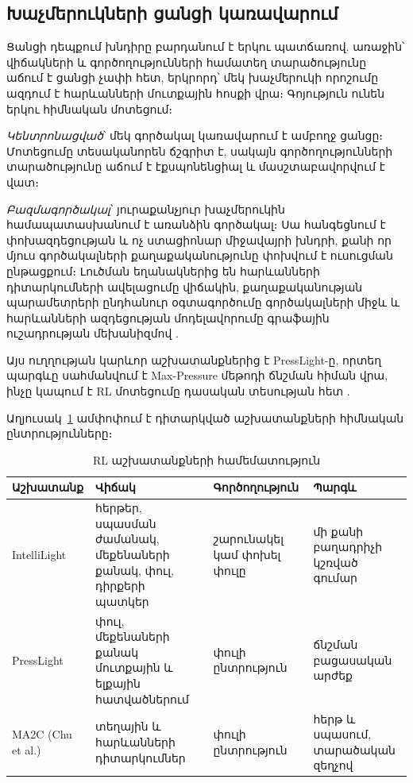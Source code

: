 \documentclass[12pt,a4paper]{extreport}
\begin{document}
\subsection{Խաչմերուկների ցանցի կառավարում}

Ցանցի դեպքում խնդիրը բարդանում է երկու պատճառով. առաջին՝ վիճակների և գործողությունների համատեղ տարածությունը աճում է ցանցի չափի հետ, երկրորդ՝ մեկ խաչմերուկի որոշումը ազդում է հարևանների մուտքային հոսքի վրա։ Գոյություն ունեն երկու հիմնական մոտեցում։

\textit{Կենտրոնացված}՝ մեկ գործակալ կառավարում է ամբողջ ցանցը։ Մոտեցումը տեսականորեն ճշգրիտ է, սակայն գործողությունների տարածությունը աճում է էքսպոնենցիալ և մասշտաբավորվում է վատ։

\textit{Բազմագործակալ}՝ յուրաքանչյուր խաչմերուկին համապատասխանում է առանձին գործակալ։ Սա հանգեցնում է փոխազդեցության և ոչ ստացիոնար միջավայրի խնդրի, քանի որ մյուս գործակալների քաղաքականությունը փոխվում է ուսուցման ընթացքում։ Լուծման եղանակներից են հարևանների դիտարկումների ավելացումը վիճակին, քաղաքականության պարամետրերի ընդհանուր օգտագործումը գործակալների միջև և հարևանների ազդեցության մոդելավորումը գրաֆային ուշադրության մեխանիզմով \cite{chu2020,colight2019}.

Այս ուղղության կարևոր աշխատանքներից է PressLight-ը, որտեղ պարգևը սահմանվում է Max-Pressure մեթոդի ճնշման հիման վրա, ինչը կապում է RL մոտեցումը դասական տեսության հետ \cite{presslight2019}.

Աղյուսակ~\ref{tab:rlworks} ամփոփում է դիտարկված աշխատանքների հիմնական ընտրությունները։

\begin{table}[ht]
\centering
\small
\begin{tabular}{|p{2.4cm}|p{3.9cm}|p{3.2cm}|p{4.4cm}|}
\hline
Աշխատանք & Վիճակ & Գործողություն & Պարգև \\
\hline
IntelliLight & հերթեր, սպասման ժամանակ, մեքենաների քանակ, փուլ, դիրքերի պատկեր & շարունակել կամ փոխել փուլը & մի քանի բաղադրիչի կշռված գումար \\
\hline
PressLight & փուլ, մեքենաների քանակ մուտքային և ելքային հատվածներում & փուլի ընտրություն & ճնշման բացասական արժեք \\
\hline
MA2C (Chu et al.) & տեղային և հարևանների դիտարկումներ & փուլի ընտրություն & հերթ և սպասում, տարածական զեղչով \\
\hline
\end{tabular}
\caption{RL աշխատանքների համեմատություն}
\label{tab:rlworks}
\end{table}
\end{document}
